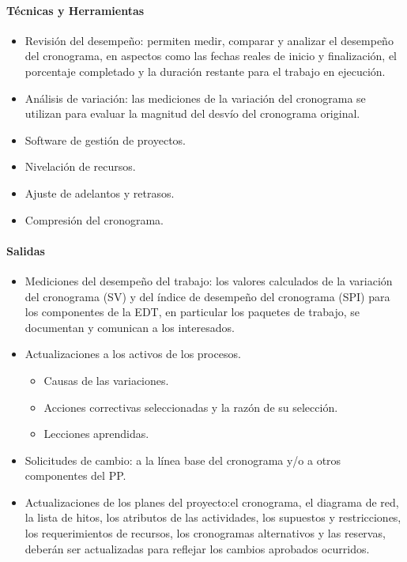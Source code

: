 \documentclass[a4paper,twosides]{article}
\newlength{\wideitemsep}
\let\olditem\item
\renewcommand{\item}{\setlength{\itemsep}{\wideitemsep}\olditem}
\begin{document}
\paragraph{Técnicas y Herramientas}
\begin{itemize}
\item Revisión del desempeño: permiten medir, comparar y analizar el desempeño del cronograma, en aspectos como las fechas reales de inicio y finalización, el porcentaje completado y la duración restante para el trabajo en ejecución.
\item Análisis de variación: las mediciones de la variación del cronograma se utilizan para evaluar la magnitud del desvío del cronograma original.
\item Software de gestión de proyectos.
\item Nivelación de recursos.
\item Ajuste de adelantos y retrasos.
\item Compresión del cronograma.
\end{itemize}

\paragraph{Salidas}
\begin{itemize}
\item Mediciones del desempeño del trabajo: los valores calculados de la variación del cronograma (SV) y del índice de desempeño del cronograma (SPI) para los componentes de la EDT, en particular los paquetes de trabajo, se documentan y comunican a los interesados.
\item Actualizaciones a los activos de los procesos.
\begin{itemize}
\item Causas de las variaciones.
\item Acciones correctivas seleccionadas y la razón de su selección.
\item Lecciones aprendidas.
\end{itemize}
\item Solicitudes de cambio: a la línea base del cronograma y/o a otros componentes del PP.
\item Actualizaciones de los planes del proyecto:el cronograma, el diagrama de red, la lista de hitos, los atributos de las actividades, los supuestos y restricciones, los requerimientos de recursos, los cronogramas alternativos y las reservas, deberán ser actualizadas para reflejar los cambios aprobados ocurridos.
\end{itemize}
\end{document}
